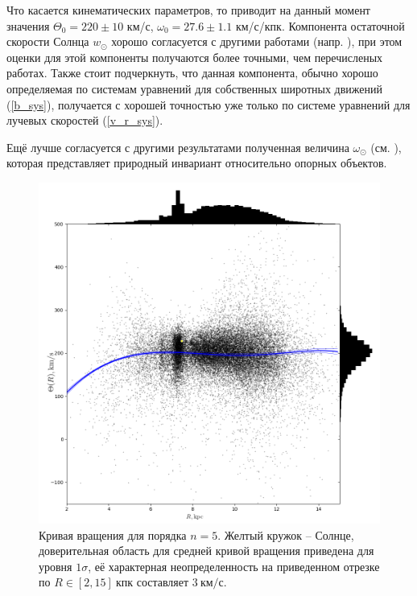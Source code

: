 \documentclass{matmex-diploma-custom}
\begin{document}
\par Что касается кинематических параметров, то \cite{CamarilloVEL} приводит на данный момент значения $\Theta_0 = 220 \pm 10$ км/с, $\omega_0 = 27.6 \pm 1.1$ км/с/кпк. Компонента остаточной скорости Солнца $w_{\odot}$ хорошо согласуется с другими работами (напр. \cite{Baikbob, Rastorguev}), при этом оценки для этой компоненты получаются более точными, чем перечисленых работах. Также стоит подчеркнуть, что данная компонента, обычно хорошо определяемая по системам уравнений для собственных широтных движений (\ref{b_sys}), получается с хорошей точностью уже только по системе уравнений для лучевых скоростей (\ref{v_r_sys}). 
\par Ещё лучше согласуется с другими результатами полученная величина $\omega_{\odot}$ (см. \cite{Rastorguev, Baikbob}), которая представляет природный инвариант относительно опорных объектов.

\begin{figure}[h!!]

\begin{center}
\begin{minipage}[p]{0.95\linewidth}
        \includegraphics[width=1.0\textwidth]{../imgs/theta_obj.png}
\end{minipage}
\end{center}
\caption{Кривая вращения для порядка $n=5$. Желтый кружок -- Солнце, доверительная область для средней кривой вращения приведена для уровня $1 \sigma$, её характерная неопределенность на приведенном отрезке по $R \in [2, 15] ~\mathrm{кпк}$ составляет $3 ~\textrm{км/с}$.}
\end{figure}
\end{document}
